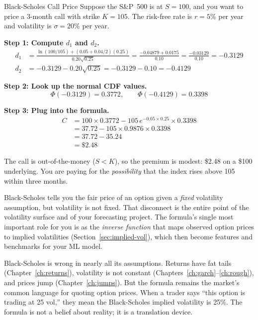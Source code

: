 \begin{workedexample}{Black-Scholes Call Price}
\label{ex:bs-calculation}
Suppose the S\&P~500 is at $S = 100$, and you want to price a 3-month call with strike $K = 105$.
The risk-free rate is $r = 5\%$ per year and volatility is $\sigma = 20\%$ per year.

\textbf{Step 1: Compute $d_1$ and $d_2$.}
\begin{align*}
  d_1 &= \frac{\ln(100/105) + (0.05 + 0.04/2)(0.25)}{0.20\sqrt{0.25}}
       = \frac{-0.04879 + 0.0175}{0.10}
       = \frac{-0.03129}{0.10}
       = -0.3129 \\
  d_2 &= -0.3129 - 0.20\sqrt{0.25}
       = -0.3129 - 0.10
       = -0.4129
\end{align*}

\textbf{Step 2: Look up the normal CDF values.}
\[
  \Phi(-0.3129) = 0.3772, \qquad \Phi(-0.4129) = 0.3398
\]

\textbf{Step 3: Plug into the formula.}
\begin{align*}
  C &= 100 \times 0.3772 - 105\,e^{-0.05 \times 0.25} \times 0.3398 \\
    &= 37.72 - 105 \times 0.9876 \times 0.3398 \\
    &= 37.72 - 35.24 \\
    &= \$2.48
\end{align*}

The call is out-of-the-money ($S < K$), so the premium is modest: \$2.48 on a \$100 underlying.
You are paying for the \emph{possibility} that the index rises above 105 within three months.
\end{workedexample}

\begin{projectconnection}
Black-Scholes tells you the fair price of an option given a \emph{fixed} volatility assumption, but volatility is not fixed.
That disconnect is the entire point of the volatility surface and of your forecasting project.
The formula's single most important role for you is as the \emph{inverse function} that maps observed option prices to implied volatilities (Section~\ref{sec:implied-vol}), which then become features and benchmarks for your ML model.
\end{projectconnection}

\begin{warning}
Black-Scholes is wrong in nearly all its assumptions.
Returns have fat tails (Chapter~\ref{ch:returns}), volatility is not constant (Chapters~\ref{ch:garch}--\ref{ch:rough}), and prices jump (Chapter~\ref{ch:jumps}).
But the formula remains the market's common language for quoting option prices.
When a trader says ``this option is trading at 25 vol,'' they mean the Black-Scholes implied volatility is 25\%.
The formula is not a belief about reality; it is a translation device.
\end{warning}

